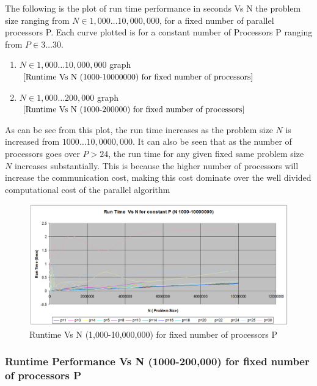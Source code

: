 \documentclass[twoside,11pt]{article}\usepackage{amsmath,amsfonts,amsthm,fullpage}
\begin{document}
The following is the plot of run time performance in seconds Vs N the problem size ranging from $N \in 1,000 \dots 10,000,000$, for a fixed number of parallel processors P. Each curve plotted is for a constant number of Processors P ranging from $P \in 3 \dots 30$.

\begin{enumerate}
\item
$N \in 1,000 \dots 10,000,000$ graph $\ref{Runtime Vs N (1000-10000000) for fixed number of processors}$
\item
$N \in 1,000 \dots 200,000$ graph $\ref{Runtime Vs N (1000-200000) for fixed number of processors}$
\end{enumerate}

As can be see from this plot, the run time increases as the problem size $N$ is increased from $1000 \dots 10,0000,000$. It can also be seen that as the number of processors goes over $P>24$, the run time for any given fixed same problem size $N$ increases substantially. This is because the higher number of processors will increase the communication cost, making this cost dominate over the well divided computational cost of the parallel algorithm
\begin{figure}[!htbp]
\centering
\includegraphics[scale=.46]{charts/p-n-t-1000-1000000} 
\caption{Runtime Vs N (1,000-10,000,000) for fixed number of processors P}
\label{Runtime Vs N (1000-10000000) for fixed number of processors}
\end{figure}


\pagebreak
\subsubsection{Runtime Performance Vs N (1000-200,000) for fixed number of processors P}
\end{document}
